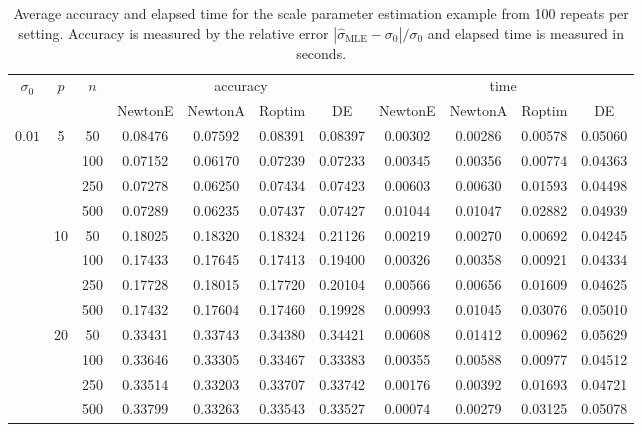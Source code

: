 \documentclass[10pt]{article}
\begin{document}
\begin{center}
	\begin{longtable}{ccccccccccc}
		\caption{
			Average accuracy and elapsed time for the scale parameter estimation example from 100 repeats per setting. Accuracy is measured by the relative error $|\hat{\sigma}_{\text{MLE}}-\sigma_0|/\sigma_0$ and elapsed time is measured in seconds. 		
		} \label{table:extended_concentration}\\
		\hline
		\multirow{2}{*}{$\sigma_0$} & \multirow{2}{*}{$p$} & \multirow{2}{*}{$n$} & \multicolumn{4}{c}{accuracy} & \multicolumn{4}{c}{time} \\ \cline{4-11} 
		&                     &    & \textsf{NewtonE} & \textsf{NewtonA} & \textsf{Roptim} & \textsf{DE} & \textsf{NewtonE} & \textsf{NewtonA} & \textsf{Roptim} & \textsf{DE} \\ \hline
		\multirow{12}{*}{$0.01$}
		& \multirow{4}{*}{5}&50 & 0.08476 & 0.07592 & 0.08391 & 0.08397 & 0.00302 & 0.00286 & 0.00578 & 0.05060 \\ \cline{3-11} 
		&&100 & 0.07152 & 0.06170 & 0.07239 & 0.07233 & 0.00345 & 0.00356 & 0.00774 & 0.04363 \\ \cline{3-11} 
		&&250 & 0.07278 & 0.06250 & 0.07434 & 0.07423 & 0.00603 & 0.00630 & 0.01593 & 0.04498 \\ \cline{3-11} 
		&&500 & 0.07289 & 0.06235 & 0.07437 & 0.07427 & 0.01044 & 0.01047 & 0.02882 & 0.04939 \\ \cline{2-11} 
		& \multirow{4}{*}{10}&50 & 0.18025 & 0.18320 & 0.18324 & 0.21126 & 0.00219 & 0.00270 & 0.00692 & 0.04245 \\ \cline{3-11} 
		&&100 & 0.17433 & 0.17645 & 0.17413 & 0.19400 & 0.00326 & 0.00358 & 0.00921 & 0.04334 \\ \cline{3-11} 
		&&250 & 0.17728 & 0.18015 & 0.17720 & 0.20104 & 0.00566 & 0.00656 & 0.01609 & 0.04625 \\ \cline{3-11} 
		&&500 & 0.17432 & 0.17604 & 0.17460 & 0.19928 & 0.00993 & 0.01045 & 0.03076 & 0.05010 \\ \cline{2-11} 
		& \multirow{4}{*}{20}&50 &  0.33431 &   0.33743 & 0.34380 & 0.34421 & 0.00608 & 0.01412 & 0.00962 & 0.05629 \\ \cline{3-11} 
		&&100 &    0.33646 &    0.33305 & 0.33467 & 0.33383 & 0.00355 & 0.00588 & 0.00977 & 0.04512 \\ \cline{3-11} 
		&&250 &    0.33514 &    0.33203 & 0.33707 & 0.33742 & 0.00176 & 0.00392 & 0.01693 & 0.04721 \\ \cline{3-11} 
		&&500 &    0.33799 &    0.33263 & 0.33543 & 0.33527 & 0.00074 & 0.00279 & 0.03125 & 0.05078 \\ \hline

\end{longtable}
\end{center}
\end{document}
